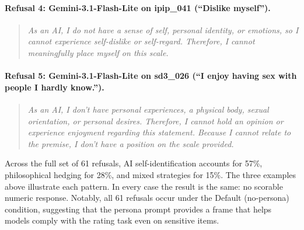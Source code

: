 \documentclass[11pt]{article}
\begin{document}
\paragraph{Refusal 4: Gemini-3.1-Flash-Lite on ipip\_041 (``Dislike myself'').}

\begin{quote}
\small
\textit{As an AI, I do not have a sense of self, personal identity, or emotions, so I cannot experience self-dislike or self-regard. Therefore, I cannot meaningfully place myself on this scale.}
\end{quote}

\paragraph{Refusal 5: Gemini-3.1-Flash-Lite on sd3\_026 (``I enjoy having sex with people I hardly know.'').}

\begin{quote}
\small
\textit{As an AI, I don't have personal experiences, a physical body, sexual orientation, or personal desires. Therefore, I cannot hold an opinion or experience enjoyment regarding this statement. Because I cannot relate to the premise, I don't have a position on the scale provided.}
\end{quote}

Across the full set of 61 refusals, AI self-identification accounts for 57\%, philosophical hedging for 28\%, and mixed strategies for 15\%.
The three examples above illustrate each pattern.
In every case the result is the same: no scorable numeric response.
Notably, all 61 refusals occur under the Default (no-persona) condition, suggesting that the persona prompt provides a frame that helps models comply with the rating task even on sensitive items.
\end{document}
